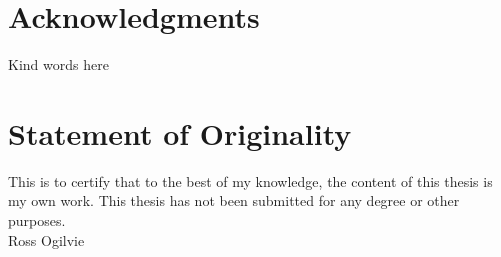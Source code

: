 
\section*{Acknowledgments}

Kind words here \todo{}

\vfill
\section*{Statement of Originality}

This is to certify that to the best of my knowledge, the content of this thesis is my own work. This thesis has not been submitted for any degree or other purposes.
\\ [2cm]
Ross Ogilvie
